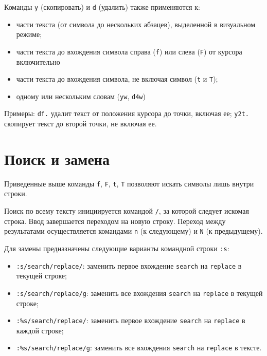 \documentclass[listings]{labreport}
\begin{document}
Команды \texttt{y} (скопировать) и \texttt{d} (удалить) также применяются к:
\begin{itemize}
\item части текста (от символа до нескольких абзацев), выделенной в визуальном режиме;
\item части текста до вхождения символа справа (\texttt{f}) или слева (\texttt{F}) от курсора включительно
\item части текста до вхождения символа, не включая символ (\texttt{t} и \texttt{T});
\item одному или нескольким словам (\texttt{yw}, \texttt{d4w})
\end{itemize}

Примеры: \texttt{df.} удалит текст от положения курсора до точки, включая ее;
\texttt{y2t.} скопирует текст до второй точки, не включая ее.

\section*{Поиск и замена}

Приведенные выше команды \texttt{f}, \texttt{F}, \texttt{t}, \texttt{T}
позволяют искать символы лишь внутри строки.

Поиск по всему тексту инициируется командой \texttt{/}, за которой следует искомая строка.
Ввод завершается переходом на новую строку. Переход между результатами осуществляется
командами \texttt{n} (к следующему) и \texttt{N} (к предыдущему).

Для замены предназначены следующие варианты командной строки \texttt{:s}:
\begin{itemize}
\item \texttt{:s/search/replace/}: заменить первое вхождение \texttt{search} на \texttt{replace} в текущей строке;
\item \texttt{:s/search/replace/g}: заменить все вхождения \texttt{search} на \texttt{replace} в текущей строке;
\item \texttt{:\%s/search/replace/}: заменить первое вхождение \texttt{search} на \texttt{replace} в каждой строке;
\item \texttt{:\%s/search/replace/g}: заменить все вхождения \texttt{search} на \texttt{replace} в тексте.
\end{itemize}
\end{document}

